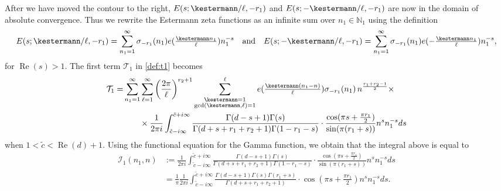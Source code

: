 \documentclass[]{article}
\renewcommand{\Re}{\operatorname{Re}}
\newcommand{\sumk}{\sum_{\substack{\kestermann = 1 \\ \gcd(\kestermann,\ell) = 1}}^\ell}
\begin{document}
After we have moved the contour to the right, $E(s;\kestermann/\ell,-r_1)$ and $E(s;-\kestermann/\ell,-r_1)$ are now in the domain of absolute convergence. Thus we rewrite the Estermann zeta functions as an infinite sum over $n_1 \in \mathbb{N}_1$ using the definition
	\begin{equation}
		E(s; \kestermann/\ell, -r_1) = \sum_{n_1=1}^\infty \sigma_{-r_1}(n_1) e( \tfrac{\kestermann n_1}{\ell}) n_1^{-s}\quad  \text{and} \quad E(s; -\kestermann/\ell, -r_1) = \sum_{n_1=1}^\infty \sigma_{-r_1}(n_1) e( -\tfrac{\kestermann n_1}{\ell}) n_1^{-s},
	\end{equation}
    for $\Re(s)>1.$ 
The first term $\mathcal{T}_1$ in \eqref{def:t1} becomes
\begin{equation}\label{eq:intermediate_identity_in_petersson_backwardsasdssd2231244}
    \begin{split}
     \mathcal{T}_1=   
   &   \sum_{n_1=1}^\infty  		  \sum_{\ell=1}^\infty   \left( \frac{2 \pi }{\ell} \right)^{r_2+1}   \sumk e(\tfrac{\kestermann (n_1- n)}{\ell}) \sigma_{-r_1}(n_1) \,   n^{  \frac{ r_1+r_2-1 }{2}   } \times  \\
&   \ \ \   \ \ \ \times \frac{1}{2 \pi i}  \int_{\tilde c-i \infty}^{\tilde c+i \infty} \frac{   \Gamma(d-s+1)   \Gamma(s)  }{\Gamma (d+s+r_1+r_2+1) \Gamma(1-r_1-s)  }        \cdot   \frac{\cos(\pi s + \frac{\pi r_1}{2})   }{\sin(\pi (r_1+s))} n^{s} n_1^{-s}  ds
    \end{split}
\end{equation}
when $1<\tilde c<\Re(d)+1$. %
Using the functional equation for the Gamma function, we obtain that the integral above is equal to
\begin{equation}\label{eq:Upsilon_first_appearence}
\begin{split}
\mathcal{I}_1(n_1,n) & :=\frac{1}{2 \pi i}  \int_{\tilde c-i \infty}^{\tilde c+i \infty} \frac{   \Gamma(d-s+1)   \Gamma(s)  }{\Gamma (d+s+r_1+r_2+1) \Gamma(1-r_1-s)  }        \cdot   \frac{\cos(\pi s + \frac{\pi r_1}{2})   }{\sin(\pi (r_1+s))} n^{s} n_1^{-s}  ds \\
& = \frac{1}{\pi} \frac{1}{2 \pi i}  \int_{\tilde c-i \infty}^{\tilde c+i \infty} \frac{   \Gamma(d-s+1)   \Gamma(s) \Gamma(r_1 + s) }{\Gamma (d+s+r_1+r_2+1)  }        \cdot   \cos(\pi s + \frac{\pi r_1}{2})   n^{s} n_1^{-s}  ds.
\end{split}
\end{equation}
\end{document}
